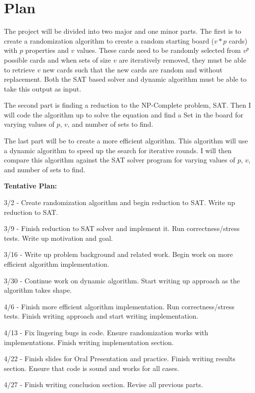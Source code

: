\documentclass[12pt]{article}%
\begin{document}
\section*{Plan}

\hspace{5mm} The project will be divided into two major and one minor parts. The first is to create a randomization algorithm to create a random starting board ($v*p$ cards) with $p$ properties and $v$ values. These cards need to be randomly selected from $v^p$ possible cards and when sets of size $v$ are iteratively removed, they must be able to retrieve $v$ new cards such that the new cards are random and without replacement. Both the SAT based solver and dynamic algorithm must be able to take this output as input. 

The second part is finding a reduction to the NP-Complete problem, SAT. Then I will code the algorithm up to solve the equation and find a Set in the board for varying values of $p$, $v$, and number of sets to find. 

The last part will be to create a more efficient algorithm. This algorithm will use a dynamic algorithm to speed up the search for iterative rounds. I will then compare this algorithm against the SAT solver program for varying values of $p$, $v$, and number of sets to find. 

\textbf{Tentative Plan:}

	3/2 - Create randomization algorithm and begin reduction to SAT. Write up reduction to SAT. 
	
	3/9 - Finish reduction to SAT solver and implement it. Run correctness/stress tests. Write up motivation and goal. 
	
	3/16 -  Write up problem background and related work. Begin work on more efficient algorithm implementation.
	 
	3/30 - Continue work on dynamic algorithm. Start writing up approach as the algorithm takes shape. 
	
	4/6 - Finish more efficient algorithm implementation. Run correctness/stress tests.  Finish writing approach and start writing implementation. 
	
	4/13 - Fix lingering bugs in code. Ensure randomization works with implementations. Finish writing implementation section. 
	
	4/22 - Finish slides for Oral Presentation and practice. Finish writing results section. Ensure that code is sound and works for all cases. 
	
	4/27 - Finish writing conclusion section. Revise all previous parts. 
	
\end{document}
